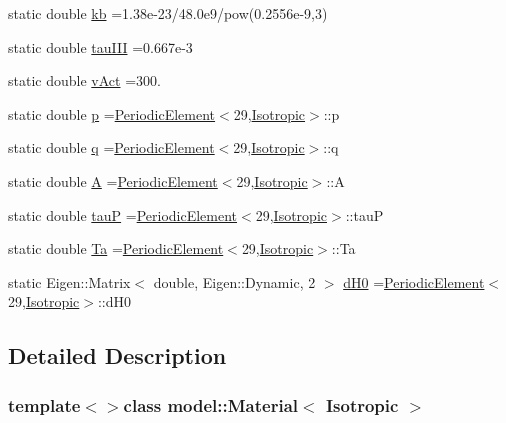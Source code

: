 \begin{DoxyCompactItemize}
static double \hyperlink{classmodel_1_1_material_3_01_isotropic_01_4_a8968e8a2f8c20c96b10892a937b1db08}{kb} =1.\+38e-\/23/48.\+0e9/pow(0.\+2556e-\/9,3)
\item 
static double \hyperlink{classmodel_1_1_material_3_01_isotropic_01_4_a3b332d99cc4ba74ddc5c400ff43cbec2}{tau\+I\+I\+I} =0.\+667e-\/3
\item 
static double \hyperlink{classmodel_1_1_material_3_01_isotropic_01_4_afd8e7f004fd95d56ac69dcfd11e740be}{v\+Act} =300.
\item 
static double \hyperlink{classmodel_1_1_material_3_01_isotropic_01_4_a1da96a1b988a82ccc9e82570818f136b}{p} =\hyperlink{structmodel_1_1_periodic_element}{Periodic\+Element}$<$29,\hyperlink{classmodel_1_1_isotropic}{Isotropic}$>$\+::p
\item 
static double \hyperlink{classmodel_1_1_material_3_01_isotropic_01_4_af860539daa43d347fcf1ac2624fb1e06}{q} =\hyperlink{structmodel_1_1_periodic_element}{Periodic\+Element}$<$29,\hyperlink{classmodel_1_1_isotropic}{Isotropic}$>$\+::q
\item 
static double \hyperlink{classmodel_1_1_material_3_01_isotropic_01_4_aba51bbf78aadc68ac1f25252cea45392}{A} =\hyperlink{structmodel_1_1_periodic_element}{Periodic\+Element}$<$29,\hyperlink{classmodel_1_1_isotropic}{Isotropic}$>$\+::A
\item 
static double \hyperlink{classmodel_1_1_material_3_01_isotropic_01_4_acc8ff01baf092b274787d9b46b37dbab}{tau\+P} =\hyperlink{structmodel_1_1_periodic_element}{Periodic\+Element}$<$29,\hyperlink{classmodel_1_1_isotropic}{Isotropic}$>$\+::tau\+P
\item 
static double \hyperlink{classmodel_1_1_material_3_01_isotropic_01_4_a607cee4e5a3a8df415708dd1dd90c678}{Ta} =\hyperlink{structmodel_1_1_periodic_element}{Periodic\+Element}$<$29,\hyperlink{classmodel_1_1_isotropic}{Isotropic}$>$\+::Ta
\item 
static Eigen\+::\+Matrix$<$ double, Eigen\+::\+Dynamic, 2 $>$ \hyperlink{classmodel_1_1_material_3_01_isotropic_01_4_a0b5ba4de6e8bc6b8303ad3b95ae19dd6}{d\+H0} =\hyperlink{structmodel_1_1_periodic_element}{Periodic\+Element}$<$29,\hyperlink{classmodel_1_1_isotropic}{Isotropic}$>$\+::d\+H0
\end{DoxyCompactItemize}


\subsection{Detailed Description}
\subsubsection*{template$<$$>$class model\+::\+Material$<$ Isotropic $>$}




